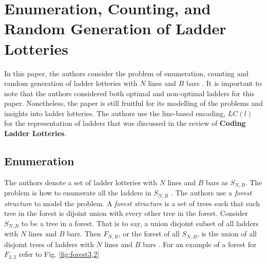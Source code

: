 \section{Enumeration, Counting, and Random Generation of Ladder Lotteries}

In this paper, the authors consider the problem of enumeration, counting and 
random generation of ladder lotteries with $N$ lines and $B$ bars \cite{A6}. 
It is important to note that the authors considered both optimal and 
non-optimal ladders for this paper. Nonetheless, the paper is still fruitful 
for its modelling of the problems and insights into ladder lotteries.
The authors use  the line-based encoding, $LC(l)$ for the representation of ladders 
that was discussed in the review of \textbf{Coding Ladder Lotteries}.

\subsection{Enumeration}
The authors denote a set of ladder lotteries with $N$ lines and 
$B$ bars as $S_{N,B}$. The problem is how to enumerate all the 
ladders in $S_{N,B}$ \cite{A6}. The authors use a \emph{forest structure}
to model the problem. A \emph{forest structure} is a set of trees 
such that each tree in the forest is dijoint union with every other 
tree in the forest. Consider $S_{N,B}$ to be a tree in a forest.
That is to say, a union disjoint subset of all ladders with $N$
lines and $B$ bars. Then $F_{N,B}$, or the forest of all $S_{N,B}$,
is the union of all disjoint trees of ladders with $N$ lines and $B$ bars \cite{A6}. For an example 
of a forest for $F_{3,2}$ refer to Fig. \ref{fig:forest3,2}\par %


